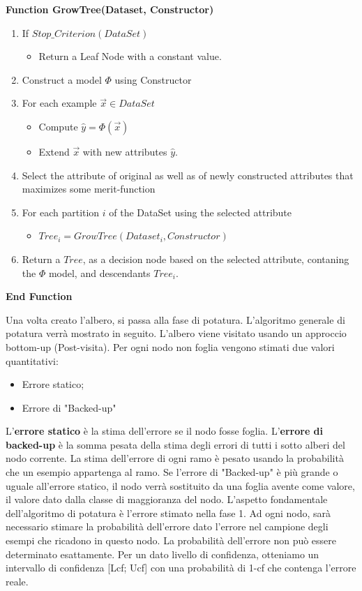 \textbf{Function GrowTree(Dataset, Constructor)}
\begin{enumerate}
	\item If $Stop\_Criterion(DataSet)$
	\begin{itemize}
		\item Return a Leaf Node with a constant value.
	\end{itemize}
	\item Construct a model $\Phi$ using Constructor
	\item For each example $\vec{x} \in DataSet$
	\begin{itemize}
		\item Compute $\hat y = \Phi(\vec{x})$
		\item Extend $\vec{x}$ with new attributes $\hat y$.
	\end{itemize}
	\item Select the attribute of original as well as of newly constructed attributes that maximizes some merit-function \label{selection}
	\item For each partition $i$ of the DataSet using the selected attribute
	\begin{itemize}
		\item $Tree_{i} = GrowTree (Dataset_{i},Constructor)$
	\end{itemize}
	\item Return a $Tree$, as a decision node based on the selected attribute, contaning the $\Phi$ model, and descendants $Tree_{i}$.
\end{enumerate}
\textbf{End Function}

Una volta creato l'albero, si passa alla fase di potatura. L'algoritmo generale di potatura verrà mostrato in seguito. L'albero viene visitato usando un approccio bottom-up (Post-visita). Per ogni nodo non foglia vengono stimati due valori quantitativi: 
\begin{itemize}
	\item Errore statico;
	\item Errore di "Backed-up"
\end{itemize}
L'\textbf{errore statico} è la stima dell'errore se il nodo fosse foglia.
L'\textbf{errore di backed-up} è la somma pesata della stima degli errori di tutti i sotto alberi del nodo corrente. La stima dell'errore di ogni ramo è pesato usando la probabilità che un esempio appartenga al ramo. Se l'errore di "Backed-up" è più grande o uguale all'errore statico, il nodo verrà sostituito da una foglia avente come valore, il valore dato dalla classe di maggioranza del nodo. L'aspetto fondamentale dell'algoritmo di potatura è l'errore stimato nella fase 1. Ad ogni nodo, sarà necessario stimare la probabilità dell'errore dato l'errore nel campione degli esempi che ricadono in questo nodo. La probabilità dell'errore non può essere determinato esattamente. Per un dato livello di confidenza, otteniamo un intervallo di confidenza [Lcf; Ucf] con una probabilità di 1-cf che contenga l'errore reale.


